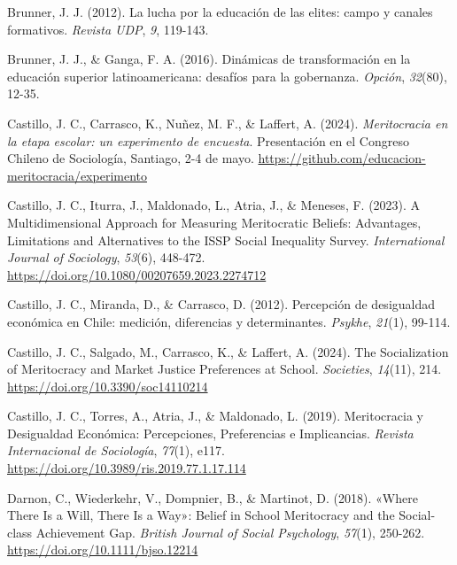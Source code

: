 \documentclass[
  spanish,
  a4paper,
  oneside]{scrbook}
\newlength{\cslhangindent}
\newenvironment{CSLReferences}[2] %
 {\begin{list}{}{%
  \setlength{\itemindent}{0pt}
  \setlength{\leftmargin}{0pt}
  \setlength{\parsep}{0pt}
  \ifodd #1
   \setlength{\leftmargin}{\cslhangindent}
   \setlength{\itemindent}{-1\cslhangindent}
  \fi
  \setlength{\itemsep}{#2\baselineskip}}}
 {\end{list}}
\begin{document}
\begin{CSLReferences}{1}{0}
Brunner, J. J. (2012). La lucha por la educación de las elites: campo y
canales formativos. \emph{Revista UDP}, \emph{9}, 119-143.

Brunner, J. J., \& Ganga, F. A. (2016). Dinámicas de transformación en
la educación superior latinoamericana: desafíos para la gobernanza.
\emph{Opción}, \emph{32}(80), 12-35.

Castillo, J. C., Carrasco, K., Nuñez, M. F., \& Laffert, A. (2024).
\emph{Meritocracia en la etapa escolar: un experimento de encuesta}.
Presentación en el Congreso Chileno de Sociología, Santiago, 2-4 de
mayo. \url{https://github.com/educacion-meritocracia/experimento}

Castillo, J. C., Iturra, J., Maldonado, L., Atria, J., \& Meneses, F.
(2023). A {Multidimensional Approach} for {Measuring Meritocratic
Beliefs}: {Advantages}, {Limitations} and {Alternatives} to the {ISSP
Social Inequality Survey}. \emph{International Journal of Sociology},
\emph{53}(6), 448-472.
\url{https://doi.org/10.1080/00207659.2023.2274712}

Castillo, J. C., Miranda, D., \& Carrasco, D. (2012). Percepción de
desigualdad económica en Chile: medición, diferencias y determinantes.
\emph{Psykhe}, \emph{21}(1), 99-114.

Castillo, J. C., Salgado, M., Carrasco, K., \& Laffert, A. (2024). The
{Socialization} of {Meritocracy} and {Market Justice Preferences} at
{School}. \emph{Societies}, \emph{14}(11), 214.
\url{https://doi.org/10.3390/soc14110214}

Castillo, J. C., Torres, A., Atria, J., \& Maldonado, L. (2019).
Meritocracia y Desigualdad Económica: {Percepciones}, Preferencias e
Implicancias. \emph{Revista Internacional de Sociología}, \emph{77}(1),
e117. \url{https://doi.org/10.3989/ris.2019.77.1.17.114}

Darnon, C., Wiederkehr, V., Dompnier, B., \& Martinot, D. (2018).
{«{Where} There Is a Will, There Is a Way»}: {Belief} in School
Meritocracy and the Social-class Achievement Gap. \emph{British Journal
of Social Psychology}, \emph{57}(1), 250-262.
\url{https://doi.org/10.1111/bjso.12214}


\end{CSLReferences}
\end{document}

